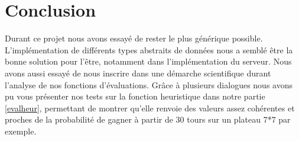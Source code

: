\documentclass[a4paper,11pt]{article}
\begin{document}
\section{Conclusion}
\label{sct:ccl}
Durant ce projet nous avons essayé de rester le plus générique possible. L'implémentation de différents types abstraits de données nous a semblé être la bonne solution pour l'être, notamment dans l'implémentation du serveur. Nous avons aussi essayé de nous inscrire dans une démarche scientifique durant l'analyse de nos fonctions d'évaluations. Grâce à plusieurs dialogues nous avons pu vous présenter nos tests sur la fonction heuristique dans notre partie \ref{evalheur}, permettant de montrer qu'elle renvoie des valeurs assez cohérentes et proches de la probabilité de gagner à partir de 30 tours sur un plateau 7*7 par exemple.

\end{document}
